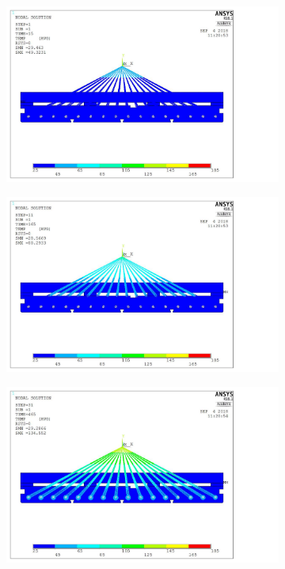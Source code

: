 \documentclass[a4paper,12pt]{report}
\begin{document}
\begin{figure}[hbtp]
	\centering
	\begin{subfigure}[b]{0.25\textwidth}
		\centering
		\includegraphics[scale=0.12]{Figures/animation/Figure_1.pdf}
	\end{subfigure}
	\qquad
	\begin{subfigure}[b]{0.25\textwidth}
		\centering
		\includegraphics[scale=0.12]{Figures/animation/Figure_3.pdf}
	\end{subfigure}
	\qquad
	\begin{subfigure}[b]{0.25\textwidth}
		\centering
		\includegraphics[scale=0.12]{Figures/animation/Figure_5.pdf}

\end{subfigure}
\end{figure}
\end{document}
